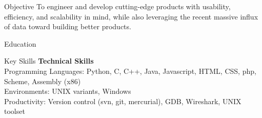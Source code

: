 \documentclass{resume}
\begin{document}
\maketitle
\thispagestyle{empty} %

\begin{component}{Objective}
To engineer and develop cutting-edge products with usability, efficiency, and scalability in mind, while also leveraging
the recent massive influx of data toward building better products. \\
\end{component}

\vspace{-0.5em}

\begin{component}{Education}
\end{component}

\begin{component}{Key Skills}
	\textbf{Technical Skills}\\
		Programming Languages: Python, C, C++, Java, Javascript, HTML, CSS, php, Scheme, Assembly (x86)\\
		Environments: UNIX variants, Windows\\
		Productivity: Version control (svn, git, mercurial), GDB, Wireshark, UNIX toolset
\end{component}
\end{document}
